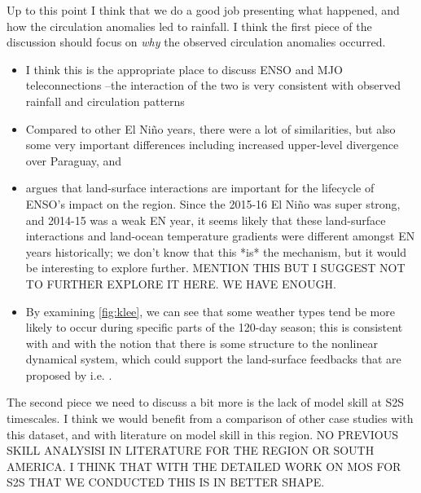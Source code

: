 \documentclass[twocol]{ametsoc}
\begin{document}
Up to this point I think that we do a good job presenting what happened, and how the circulation anomalies led to rainfall.
I think the first piece of the discussion should focus on \emph{why} the observed circulation anomalies occurred.
\begin{itemize}
	\item I think this is the appropriate place to discuss ENSO and MJO teleconnections --the interaction of the two is very consistent with observed rainfall and circulation patterns
	\item Compared to other El Ni\~{n}o years, there were a lot of similarities, but also some very important differences including increased upper-level divergence over Paraguay, and
	\item \citet{Grimm2009} argues that land-surface interactions are important for the lifecycle of ENSO's impact on the region.
	Since the 2015-16 El Ni\~no was super strong, and 2014-15 was a weak EN year, it seems likely that these land-surface interactions and land-ocean temperature gradients were different amongst EN years historically; we don't know that this *is* the mechanism, but it would be interesting to explore further. MENTION THIS BUT I SUGGEST NOT TO FURTHER EXPLORE IT HERE. WE HAVE ENOUGH.
	\item By examining \cref{fig:klee}, we can see that some weather types tend be more likely to occur during specific parts of the 120-day season; this is consistent with \citet{Munoz2016} and with the notion that there is some structure to the nonlinear dynamical system, which could support the land-surface feedbacks that are proposed by i.e. \citep{Grimm:2009bq}.
\end{itemize}

The second piece we need to discuss a bit more is the lack of model skill at S2S timescales.
I think we would benefit from a comparison of other case studies with this dataset, and with literature on model skill in this region.
NO PREVIOUS SKILL ANALYSISI IN LITERATURE FOR THE REGION OR SOUTH AMERICA. I THINK THAT WITH THE DETAILED WORK ON MOS FOR S2S THAT WE CONDUCTED THIS IS IN BETTER SHAPE.
\end{document}
